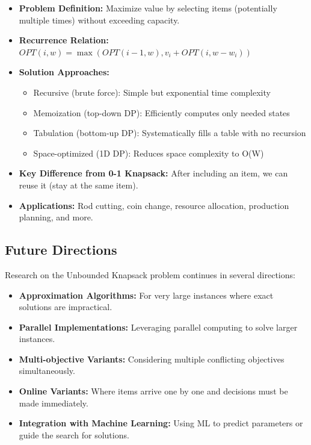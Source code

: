 \documentclass{article}
\begin{document}
\begin{itemize}[leftmargin=*]
    \item \textbf{Problem Definition:} Maximize value by selecting items (potentially multiple times) without exceeding capacity.
    
    \item \textbf{Recurrence Relation:} $OPT(i, w) = \max(OPT(i-1, w), v_i + OPT(i, w-w_i))$
    
    \item \textbf{Solution Approaches:} 
    \begin{itemize}
        \item Recursive (brute force): Simple but exponential time complexity
        \item Memoization (top-down DP): Efficiently computes only needed states
        \item Tabulation (bottom-up DP): Systematically fills a table with no recursion
        \item Space-optimized (1D DP): Reduces space complexity to O(W)
    \end{itemize}
    
    \item \textbf{Key Difference from 0-1 Knapsack:} After including an item, we can reuse it (stay at the same item).
    
    \item \textbf{Applications:} Rod cutting, coin change, resource allocation, production planning, and more.
\end{itemize}

\subsection{Future Directions}

Research on the Unbounded Knapsack problem continues in several directions:

\begin{itemize}[leftmargin=*]
    \item \textbf{Approximation Algorithms:} For very large instances where exact solutions are impractical.
    
    \item \textbf{Parallel Implementations:} Leveraging parallel computing to solve larger instances.
    
    \item \textbf{Multi-objective Variants:} Considering multiple conflicting objectives simultaneously.
    
    \item \textbf{Online Variants:} Where items arrive one by one and decisions must be made immediately.
    
    \item \textbf{Integration with Machine Learning:} Using ML to predict parameters or guide the search for solutions.
\end{itemize}
\end{document}
